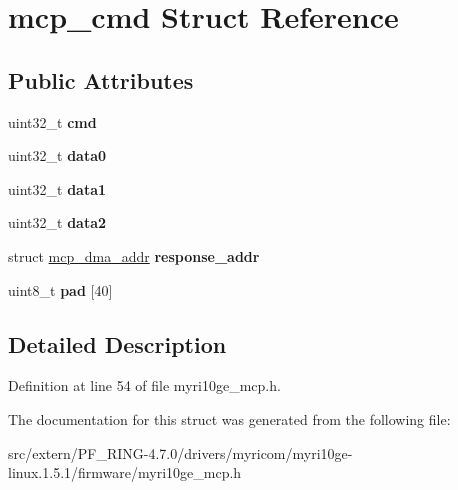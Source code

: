 \hypertarget{structmcp__cmd}{
\section{mcp\_\-cmd Struct Reference}
\label{structmcp__cmd}
}
\subsection*{Public Attributes}
\begin{DoxyCompactItemize}
\item 
\hypertarget{structmcp__cmd_a8838e8d8f4ae0da6837cb96ce02e484b}{
uint32\_\-t {\bfseries cmd}}
\label{structmcp__cmd_a8838e8d8f4ae0da6837cb96ce02e484b}

\item 
\hypertarget{structmcp__cmd_a224336bae9e94de387c97c5e5cc6e7b1}{
uint32\_\-t {\bfseries data0}}
\label{structmcp__cmd_a224336bae9e94de387c97c5e5cc6e7b1}

\item 
\hypertarget{structmcp__cmd_aed6b1ba77021d7c143e3ea19b6446235}{
uint32\_\-t {\bfseries data1}}
\label{structmcp__cmd_aed6b1ba77021d7c143e3ea19b6446235}

\item 
\hypertarget{structmcp__cmd_ae5e7039934fe032874b24154d41e61b5}{
uint32\_\-t {\bfseries data2}}
\label{structmcp__cmd_ae5e7039934fe032874b24154d41e61b5}

\item 
\hypertarget{structmcp__cmd_aede233d6e9177d220bd5ee559f19ab96}{
struct \hyperlink{structmcp__dma__addr}{mcp\_\-dma\_\-addr} {\bfseries response\_\-addr}}
\label{structmcp__cmd_aede233d6e9177d220bd5ee559f19ab96}

\item 
\hypertarget{structmcp__cmd_a238409c416801c40b69d17bb054b9fe2}{
uint8\_\-t {\bfseries pad} \mbox{[}40\mbox{]}}
\label{structmcp__cmd_a238409c416801c40b69d17bb054b9fe2}

\end{DoxyCompactItemize}


\subsection{Detailed Description}


Definition at line 54 of file myri10ge\_\-mcp.h.



The documentation for this struct was generated from the following file:\begin{DoxyCompactItemize}
\item 
src/extern/PF\_\-RING-\/4.7.0/drivers/myricom/myri10ge-\/linux.1.5.1/firmware/myri10ge\_\-mcp.h\end{DoxyCompactItemize}
